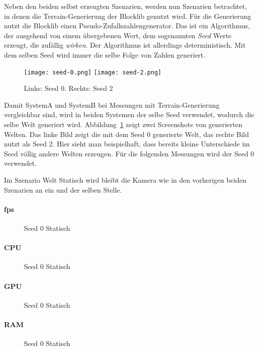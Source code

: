 Neben den beiden selbst erzeugten Szenarien, werden nun Szenarien betrachtet, in denen die Terrain-Generierung der Blocklib genutzt wird. Für die Generierung nutzt die Blocklib einen Pseudo-Zufallszahlengenerator. Das ist ein Algorithmus, der ausgehend von einem übergebenen Wert, dem sogenannten \emph{Seed} Werte erzeugt, die zufällig \emph{wirken}. Der Algorithmus ist allerdings deterministisch. Mit dem selben Seed wird immer die selbe Folge von Zahlen generiert.

\begin{figure}
	\centering
	\texttt{[image: seed-0.png]}
	\hfill
	\texttt{[image: seed-2.png]}
	\caption{Links: Seed 0. Rechts: Seed 2}\label{fig:static}
\end{figure}
Damit SystemA und SystemB bei Messungen mit Terrain-Generierung vergleichbar sind, wird in beiden Systemen der selbe Seed verwendet, wodurch die selbe Welt generiert wird. Abbildung~\ref{fig:static} zeigt zwei Screenshots von generierten Welten. Das linke Bild zeigt die mit dem Seed $0$ generierte Welt, das rechte Bild nutzt als Seed $2$. Hier sieht man beispielhaft, dass bereits kleine Unterschiede im Seed völlig andere Welten erzeugen. Für die folgenden Messungen wird der Seed $0$ verwendet. 

Im Szenario Welt Statisch wird bleibt die Kamera wie in den vorherigen beiden Szenarien an ein und der selben Stelle.



\paragraph{\ac{fps}}
\begin{figure}[!htbp]
	\caption{Seed 0 Statisch}\label{fig:seed-0-static-fps}
\end{figure}

\paragraph{CPU}
\begin{figure}[!htbp]
	\caption{Seed 0 Statisch}\label{fig:seed-0-static-cpu}
\end{figure}

\paragraph{GPU}
\begin{figure}[!htbp]
	\caption{Seed 0 Statisch}\label{fig:seed-0-static-gpu}
\end{figure}

\paragraph{RAM}
\begin{figure}[!htbp]
	\caption{Seed 0 Statisch}\label{fig:seed-0-static-mem}
\end{figure} 
